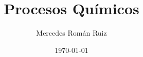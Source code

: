 \documentclass[10pt, a4paper, twoside, twocolumn]{book}
\title{Procesos Químicos}
\author{Mercedes Román Ruiz}
\date{\today}
\theoremstyle{definition}
\begin{document}
\sloppy 
\setlength{\parindent}{30pt}
\setlength{\parskip}{6pt}
\renewcommand\thesection{\arabic{section}}
\renewcommand{\baselinestretch}{1.5}
\renewcommand{\listtablename}{Índice de tablas} %
\renewcommand{\tablename}{Tabla} %
\renewcommand{\baselinestretch}{1.5}

\fancyhead{}
\fancyfoot{}
\pagestyle{fancy}
\chead[\rightmark]{\leftmark}

\fancyfoot[LE,RO]{\thepage}

%

%

%



\end{document}
